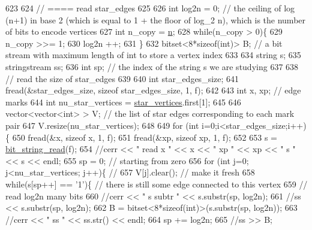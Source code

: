 \begin{DoxyCode}
623 
624   \textcolor{comment}{// ==== read star\_edges}
625 
626   \textcolor{keywordtype}{int} log2n = 0; \textcolor{comment}{// the ceiling of log (n+1) in base 2 (which is equal to 1 + the floor of log\_2 n), which
       is the number of bits to encode vertices}
627   \textcolor{keywordtype}{int} n\_copy = \hyperlink{classmarked__graph__compressed_a8d841016ddb11cfd33748c8deb6277ba}{n};
628   \textcolor{keywordflow}{while}(n\_copy > 0)\{
629     n\_copy >>= 1;
630     log2n ++;
631   \}
632   bitset<8*sizeof(int)> B; \textcolor{comment}{// a bit stream with maximum length of int to store a vertex index}
633 
634   \textcolor{keywordtype}{string} s;
635   stringstream ss;
636   \textcolor{keywordtype}{int} sp; \textcolor{comment}{// the index of the string s we are studying }
637 
638   \textcolor{comment}{// read the size of star\_edges}
639 
640   \textcolor{keywordtype}{int} star\_edges\_size;
641   fread(&star\_edges\_size, \textcolor{keyword}{sizeof} star\_edges\_size, 1, f);
642 
643   \textcolor{keywordtype}{int} x, xp; \textcolor{comment}{// edge marks}
644   \textcolor{keywordtype}{int} nu\_star\_vertices = \hyperlink{classmarked__graph__compressed_a7a4ced4586e2e353f9076bd447df5208}{star\_vertices}.first[1];
645 
646   vector<vector<int> > V; \textcolor{comment}{// the list of star edges corresponding to each mark pair}
647   V.resize(nu\_star\_vertices);
648 
649   \textcolor{keywordflow}{for} (\textcolor{keywordtype}{int} i=0;i<star\_edges\_size;i++)\{
650     fread(&x, \textcolor{keyword}{sizeof} x, 1, f);
651     fread(&xp, \textcolor{keyword}{sizeof} xp, 1, f);
652   
653     s = \hyperlink{compression__helper_8cpp_a40e8dcbc036f96b28e003e882c4890b7}{bit\_string\_read}(f);
654     \textcolor{comment}{//cerr << " read  x " << x << " xp " << xp << " s " << s << endl;}
655     sp = 0; \textcolor{comment}{// starting from zero }
656     \textcolor{keywordflow}{for} (\textcolor{keywordtype}{int} j=0; j<nu\_star\_vertices; j++)\{ \textcolor{comment}{// }
657       V[j].clear(); \textcolor{comment}{// make it fresh}
658       \textcolor{keywordflow}{while}(s[sp++] == \textcolor{charliteral}{'1'})\{ \textcolor{comment}{// there is still some edge connected to this vertex }
659         \textcolor{comment}{// read log2n many bits}
660         \textcolor{comment}{//cerr << " s subtr " << s.substr(sp, log2n);}
661         \textcolor{comment}{//ss << s.substr(sp, log2n);}
662         B = bitset<8*sizeof(int)>(s.substr(sp, log2n));
663         \textcolor{comment}{//cerr << " ss " << ss.str() << endl;}
664         sp += log2n;
665         \textcolor{comment}{//ss >> B;}

\end{DoxyCode}
